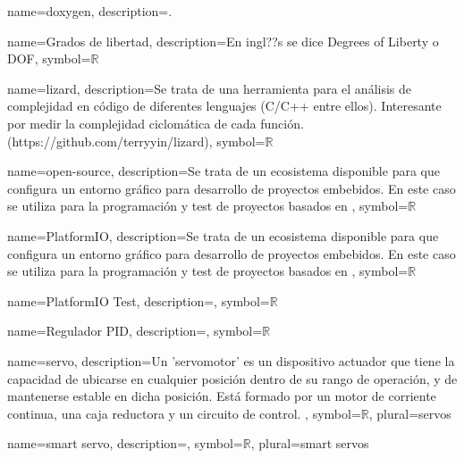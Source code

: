 {
  name={doxygen},
  description={\completar.}
}


{
  name={Grados de libertad},
  description={\completar En ingl??s se dice Degrees of Liberty o DOF},
  symbol={\ensuremath{\mathbb{R}}}
}


{
  name={lizard},
  description={Se trata de una herramienta para el análisis de complejidad en código de diferentes lenguajes (C/C++ entre ellos). Interesante por medir la complejidad ciclomática de cada función. (https://github.com/terryyin/lizard)},
  symbol={\ensuremath{\mathbb{R}}}
}

{
  name={open-source},
  description={Se trata de un ecosistema  disponible para  que configura un entorno gráfico para desarrollo de proyectos embebidos. En este caso se utiliza para la programación y test de proyectos basados en },
  symbol={\ensuremath{\mathbb{R}}}
}

{
  name={PlatformIO},
  description={Se trata de un ecosistema  disponible para  que configura un entorno gráfico para desarrollo de proyectos embebidos. En este caso se utiliza para la programación y test de proyectos basados en },
  symbol={\ensuremath{\mathbb{R}}}
}

{
  name={PlatformIO Test},
  description={\completar},
  symbol={\ensuremath{\mathbb{R}}}
}

{
  name={Regulador PID},
  description={\completar},
  symbol={\ensuremath{\mathbb{R}}}
}

{
  name={servo},
  description={Un 'servomotor' es un dispositivo actuador que tiene la capacidad de ubicarse en cualquier posición dentro de su rango de operación, y de mantenerse estable en dicha posición. Está formado por un motor de corriente continua, una caja reductora y un circuito de control. %
  \completar },
  symbol={\ensuremath{\mathbb{R}}},
  plural={servos}
}

{
  name={smart servo},
  description={\completar},
  symbol={\ensuremath{\mathbb{R}}},
  plural={smart servos}
}





